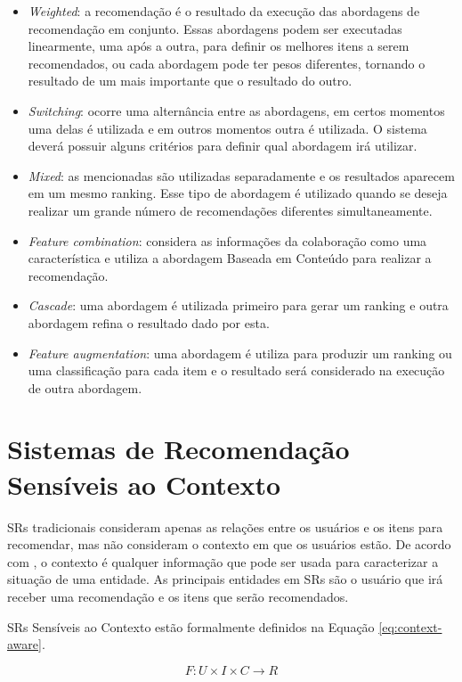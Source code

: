 \begin{itemize}
\item \textit{Weighted}: a recomendação é o resultado da execução das abordagens de recomendação em conjunto. Essas abordagens podem
ser executadas linearmente, uma após a outra, para definir os melhores itens a serem recomendados, ou cada abordagem
pode ter pesos diferentes, tornando o resultado de um mais importante que o resultado do outro.
\item \textit{Switching}: ocorre uma alternância entre as abordagens, em certos momentos uma delas é utilizada e em outros
momentos outra é utilizada. O sistema deverá possuir alguns critérios para definir qual abordagem irá utilizar.
\item \textit{Mixed}: as mencionadas são utilizadas separadamente e os resultados aparecem em um mesmo ranking. Esse tipo de
abordagem é utilizado quando se deseja realizar um grande número de recomendações diferentes simultaneamente.
\item \textit{Feature combination}: considera as informações da colaboração como uma característica e utiliza a abordagem
Baseada em Conteúdo para realizar a recomendação.
\item \textit{Cascade}: uma abordagem é utilizada primeiro para gerar um ranking e outra abordagem refina o resultado dado
por esta.
\item \textit{Feature augmentation}: uma abordagem é utiliza para produzir um ranking ou uma classificação para cada item e o
resultado será considerado na execução de outra abordagem.
\end{itemize}

\section{Sistemas de Recomendação Sensíveis ao Contexto}\label{section:sr-sensivel-contexto}

SRs tradicionais consideram apenas as relações entre os usuários e os itens para recomendar, mas não consideram o
contexto em que os usuários estão. De acordo com , o contexto é qualquer informação
que pode ser usada para caracterizar a situação de uma entidade. As principais entidades em SRs são o usuário que
irá receber uma recomendação e os itens que serão recomendados.

SRs Sensíveis ao Contexto estão formalmente definidos na Equação \ref{eq:context-aware}.

\begin{equation}
  F: U \times I \times C \rightarrow R
  \label{eq:context-aware}
\end{equation}

